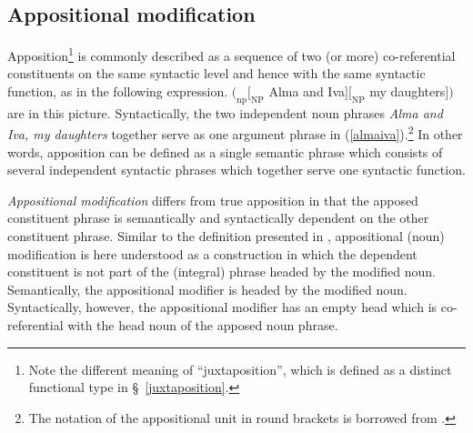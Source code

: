 \subsection{Appositional modification} \label{apposition}
Apposition\footnote{Note the different meaning of “juxtaposition”, which is defined as a distinct functional type in \S~\ref{juxtaposition}.} is commonly described as a sequence of two (or more) co-referential constituents on the same syntactic level and hence with the same syntactic function, as in the following expression.
\ea
$(_\textrm{np} [_\textrm{NP}$ Alma and Iva$] [_\textrm{NP}$ my daughters$] )$ are in this picture. \label{almaiva}
\z{}
Syntactically, the two independent noun phrases \textit{Alma and Iva, my daughters} together serve as one argument phrase in (\ref{almaiva}).\footnote{The notation of the appositional unit in round brackets is borrowed from \citet[21]{rijkhoff2002}.} In other words, apposition can be defined as a single semantic phrase which consists of several independent syntactic phrases which together serve one syntactic function.

\emph{Appositional modification} differs from true apposition in that the apposed constituent phrase is semantically and syntactically dependent on the other constituent phrase. Similar to the definition presented in \citet[22]{rijkhoff2002}, appositional (noun) modification is here understood as a construction in which the dependent constituent is not part of the (integral) phrase headed by the modified noun. Semantically, the appositional modifier is headed by the modified noun. Syntactically, however, the appositional modifier has an empty head which is co-referential with the head noun of the apposed noun phrase.

